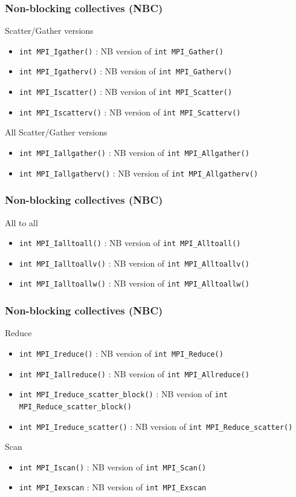 \begin{frame}[containsverbatim]
\frametitle{Non-blocking collectives (NBC)}
Scatter/Gather versions
\begin{itemize}
	\item{\verb+int MPI_Igather()+ : NB version of \verb+int MPI_Gather()+}
	\item{\verb+int MPI_Igatherv()+ : NB version of \verb+int MPI_Gatherv()+}
	\item{\verb+int MPI_Iscatter()+ : NB version of \verb+int MPI_Scatter()+}
	\item{\verb+int MPI_Iscatterv()+ : NB version of \verb+int MPI_Scatterv()+}
\end{itemize}
All Scatter/Gather versions
\begin{itemize}
	\item{\verb+int MPI_Iallgather()+ : NB version of \verb+int MPI_Allgather()+}
	\item{\verb+int MPI_Iallgatherv()+ : NB version of \verb+int MPI_Allgatherv()+}
\end{itemize}
\end{frame}


\begin{frame}[containsverbatim]
\frametitle{Non-blocking collectives (NBC)}
All to all
\begin{itemize}
	\item{\verb+int MPI_Ialltoall()+ : NB version of \verb+int MPI_Alltoall()+}
	\item{\verb+int MPI_Ialltoallv()+ : NB version of \verb+int MPI_Alltoallv()+}
	\item{\verb+int MPI_Ialltoallw()+ : NB version of \verb+int MPI_Alltoallw()+}
\end{itemize}
\end{frame}

\begin{frame}[containsverbatim]
\frametitle{Non-blocking collectives (NBC)}
Reduce
\begin{itemize}
	\item{\verb+int MPI_Ireduce()+ : NB version of \verb+int MPI_Reduce()+}
	\item{\verb+int MPI_Iallreduce()+ : NB version of \verb+int MPI_Allreduce()+}
	\item{\verb+int MPI_Ireduce_scatter_block()+ : NB version of \verb+int MPI_Reduce_scatter_block()+}
	\item{\verb+int MPI_Ireduce_scatter()+ : NB version of \verb+int MPI_Reduce_scatter()+}
\end{itemize}
Scan
\begin{itemize}
	\item{\verb+int MPI_Iscan()+ : NB version of \verb+int MPI_Scan()+}
	\item{\verb+int MPI_Iexscan+ : NB version of \verb+int MPI_Exscan+}
\end{itemize}
\end{frame}


